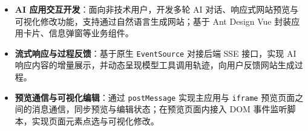 \documentclass[10pt]{article}
\begin{document}
    \vspace{0.18em}

    \begin{itemize}
        \item \textbf{AI 应用交互开发}：面向非技术用户，开发多轮 AI 对话、响应式网站预览与可视化修改功能，支持通过自然语言生成网站；基于 Ant Design Vue 封装应用卡片、信息弹窗等业务组件。
        \item \textbf{流式响应与过程反馈}：基于原生 \texttt{EventSource} 对接后端 SSE 接口，实现 AI 响应内容的增量展示，并动态呈现模型工具调用轨迹，向用户反馈网站生成过程。
        \item \textbf{预览通信与可视化编辑}：通过 \texttt{postMessage} 实现主应用与 \texttt{iframe} 预览页面之间的消息通信，同步预览与编辑状态；在预览页面内接入 DOM 事件监听脚本，实现页面元素点选与可视化修改。
    \end{itemize}

\end{document}
